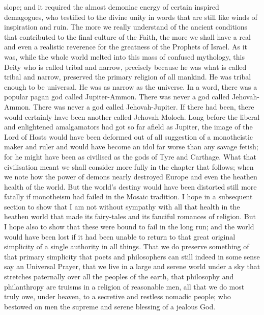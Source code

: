slope; and it required the almost demoniac energy of certain inspired demagogues, who testified to the divine unity in words that are still like winds of inspiration and ruin. The more we really understand of the ancient conditions that contributed to the final culture of the Faith, the more we shall have a real and even a realistic reverence for the greatness of the Prophets of Israel. As it was, while the whole world melted into this mass of confused mythology, this Deity who is called tribal and narrow, precisely because he was what is called tribal and narrow, preserved the primary religion of all mankind. He was tribal enough to be universal. He was as narrow as the universe. In a word, there was a popular pagan god called Jupiter-Ammon. There was never a god called Jehovah-Ammon. There was never a god called Jehovah-Jupiter. If there had been, there would certainly have been another called Jehovah-Moloch. Long before the liberal and enlightened amalgamators had got so far afield as Jupiter, the image of the Lord of Hosts would have been deformed out of all suggestion of a monotheistic maker and ruler and would have become an idol far worse than any savage fetish; for he might have been as civilised as the gods of Tyre and Carthage. What that civilisation meant we shall consider more fully in the chapter that follows; when we note how the power of demons nearly destroyed Europe and even the heathen health of the world. But the world's destiny would have been distorted still more fatally if monotheism had failed in the Mosaic tradition. I hope in a subsequent section to show that I am not without sympathy with all that health in the heathen world that made its fairy-tales and its fanciful romances of religion. But I hope also to show that these were bound to fail in the long run; and the world would have been lost if it had been unable to return to that great original simplicity of a single authority in all things. That we do preserve something of that primary simplicity that poets and philosophers can still indeed in some sense say an Universal Prayer, that we live in a large and serene world under a sky that stretches paternally over all the peoples of the earth, that philosophy and philanthropy are truisms in a religion of reasonable men, all that we do most truly owe, under heaven, to a secretive and restless nomadic people; who bestowed on men the supreme and serene blessing of a jealous God.

